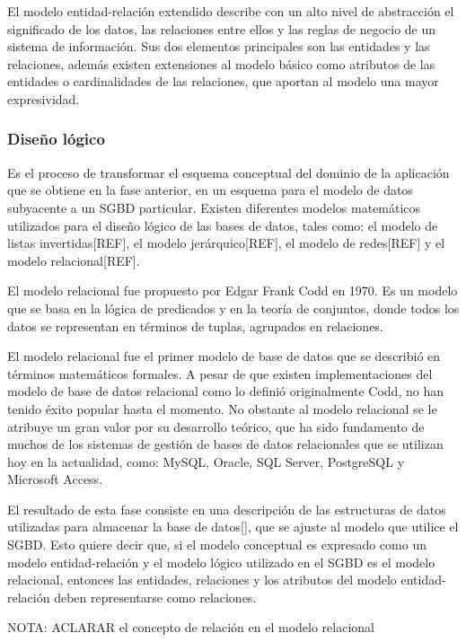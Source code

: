 El modelo entidad-relación extendido describe con un alto nivel de abstracción
el significado de los datos, las relaciones entre ellos y las reglas de negocio 
de un sistema de información. Sus dos elementos principales son las entidades y 
las relaciones, además existen extensiones al modelo básico 
como atributos de las entidades o cardinalidades de las relaciones, 
que aportan al modelo una mayor expresividad.



\subsubsection{Diseño lógico}
Es el proceso de transformar el esquema conceptual del dominio de la aplicación
que se obtiene en la fase anterior,
en un esquema para el modelo de datos subyacente a un SGBD particular.
Existen diferentes modelos matemáticos utilizados para el diseño lógico
de las bases de datos, tales como: el modelo de listas invertidas[REF], el modelo 
jerárquico[REF], el modelo de redes[REF] y el modelo relacional[REF]. 

El modelo relacional fue propuesto por Edgar Frank Codd en 1970. Es un 
modelo que se basa en la lógica de predicados y en la teoría 
de conjuntos, donde todos los datos se representan en términos de tuplas, 
agrupados en relaciones.

El modelo relacional fue el primer modelo de base de datos que se describió en términos 
matemáticos formales. A pesar de que existen  
implementaciones del modelo de base de datos relacional como lo definió originalmente 
Codd, no han tenido éxito popular hasta el momento. No obstante al modelo relacional se le 
atribuye un gran valor por su desarrollo teórico, que ha sido fundamento de muchos de los 
sistemas de gestión de bases de datos relacionales que se utilizan hoy en la actualidad, como:
MySQL, Oracle, SQL Server, PostgreSQL y Microsoft Access. 

El resultado de esta fase consiste en una descripción de las estructuras 
de datos utilizadas para almacenar la base de datos[\cite{db_book_cap3}], que se 
ajuste al modelo que utilice el SGBD. Esto quiere decir que,
si el modelo conceptual es expresado como un modelo 
entidad-relación y el modelo lógico utilizado en el SGBD es el modelo 
relacional, entonces las entidades, relaciones y los atributos del modelo entidad-relación
deben representarse como relaciones. 

NOTA: ACLARAR el concepto de relación en el modelo relacional


